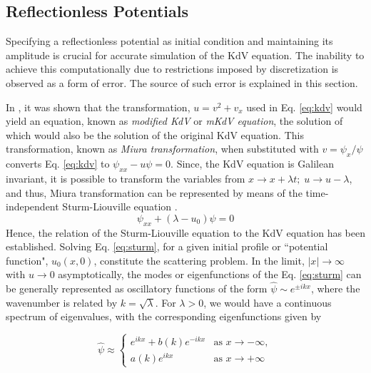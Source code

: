\documentclass{svjour3}                    %
\begin{document}
\subsection{Reflectionless Potentials}
\label{subsec:ref}
Specifying a reflectionless potential as initial condition and maintaining its amplitude is crucial for accurate simulation of the KdV equation. The inability to achieve this computationally due to restrictions imposed by discretization is observed as a form of error. The source of such error is explained in this section.

In \cite{Miura1968}, it was shown that the transformation, $u = v^2 + v_x$ used in Eq. \eqref{eq:kdv} would yield an equation, known as \emph{modified KdV} or \emph{mKdV equation}, the solution of which would also be the solution of the original KdV equation. This transformation, known as \emph{Miura transformation}, when substituted with $v = {\psi_x}/{\psi}$ converts Eq. \eqref{eq:kdv} to $\psi_{xx}-u\psi=0$. Since, the KdV equation is Galilean invariant, it is possible to transform the variables from $ x \to x+\lambda t;\; u \to u - \lambda$, and thus, Miura transformation can be represented by means of the time-independent Sturm-Liouville equation \cite[pp. 64-66]{Drazin1989}.
\begin{equation}
\label{eq:sturm}
\psi_{xx} + (\lambda - u_0) \psi = 0
\end{equation}
Hence, the relation of the Sturm-Liouville equation to the KdV equation has been established. Solving Eq. \eqref{eq:sturm}, for a given initial profile or ``potential function", $u_0(x,0)$, constitute the scattering problem. In the limit, $|x| \to \infty$ with $u \to 0$ asymptotically, the modes or eigenfunctions of the Eq. \eqref{eq:sturm} can be generally represented as oscillatory functions of the form $\hat{\psi} \sim e^{\pm ikx}$, where the wavenumber is related by $k=\sqrt{\lambda}$. For $\lambda>0$, we would have a continuous spectrum of eigenvalues, with the corresponding eigenfunctions given by

\begin{equation*}
\label{eq:sturm_bc}
\hat{\psi} \approx
\begin{cases}
e^{ikx} + b(k)e^{-ikx} & \text{as } x \to -\infty,\\
a(k)e^{ikx} & \text{as } x \to +\infty
\end{cases}
\end{equation*}
\end{document}
